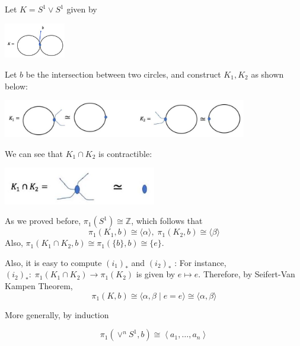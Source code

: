 \begin{example} Let \(K = {S}^{1} \vee  {S}^{1}\) given by
\begin{center}
\includegraphics[width=0.2\textwidth]{images/Ch9_S1vS1.jpg}
\end{center}

Let \(b\) be the intersection between two circles, and construct \({K}_{1},{K}_{2}\) as shown below: 

\begin{center}
\includegraphics[width=0.8\textwidth]{images/Ch9_K1K2_1.jpg}
\end{center}

We can see that \({K}_{1} \cap  {K}_{2}\) is contractible:
\begin{center}
\includegraphics[width=0.5\textwidth]{images/Ch9_K1capK2_1.jpg}
\end{center}
As we proved before, \({\pi }_{1}\left( {S}^{1}\right)  \cong  \mathbb{Z}\), which follows that
\[
{\pi }_{1}\left( {{K}_{1},b}\right)  \cong  \langle \alpha \rangle,\;{\pi }_{1}\left( {{K}_{2},b}\right)  \cong  \langle \beta \rangle
\]
Also, \({\pi }_{1}\left( {{K}_{1} \cap  {K}_{2},b}\right)  \cong  {\pi }_{1}\left( {\{ b\},b}\right)  \cong  \{ e\} \text{. }
\)

Also, it is easy to compute \({\left( {i}_{1}\right) }_{ * }\) and \({\left( {i}_{2}\right) }_{ * }\) : For instance, \({\left( {i}_{2}\right) }_{ * } : \;{\pi }_{1}\left( {{K}_{1} \cap  {K}_{2}}\right)  \rightarrow  {\pi }_{1}\left( {K}_{2}\right)\)
is given by $e \mapsto  e$. 
Therefore, by Seifert-Van Kampen Theorem,
\[
{\pi }_{1}\left( {K,b}\right)  \cong  \langle \alpha,\beta  \mid  e = e\rangle  \cong  \langle \alpha,\beta \rangle
\]

More generally, by induction

\[
{\pi }_{1}\left( {{ \vee  }^{n}{S}^{1},b}\right)  \cong  \left\langle  {{a}_{1},\ldots,{a}_{n}}\right\rangle
\]


\end{example}
